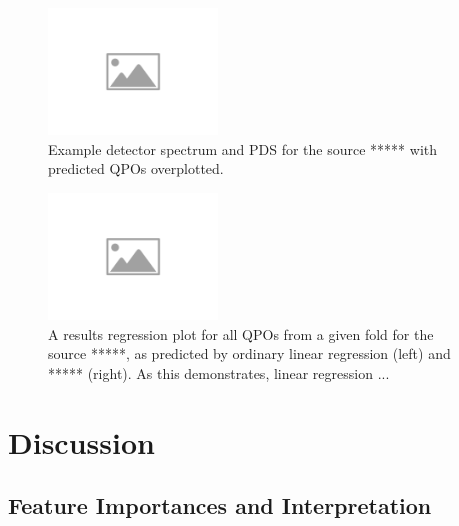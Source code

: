 \documentclass[fleqn,usenatbib]{mnras}
\begin{document}
\begin{figure}
    \centering
    \includegraphics[width=0.4\textwidth]{figures/placeholder-image.png}
    \caption{Example detector spectrum and PDS for the source ***** with predicted QPOs overplotted.}
    \label{fig:example_pds}
\end{figure}

\begin{figure}
    \centering
    \includegraphics[width=0.4\textwidth]{figures/placeholder-image.png}
    \caption{A results regression plot for all QPOs from a given fold for the source *****, as predicted by ordinary linear regression (left) and ***** (right). As this demonstrates, linear regression ...}
    \label{fig:results_regression}
\end{figure}



\section{Discussion}\label{sec:discussion}

\subsection{Feature Importances and Interpretation} 
\end{document}
